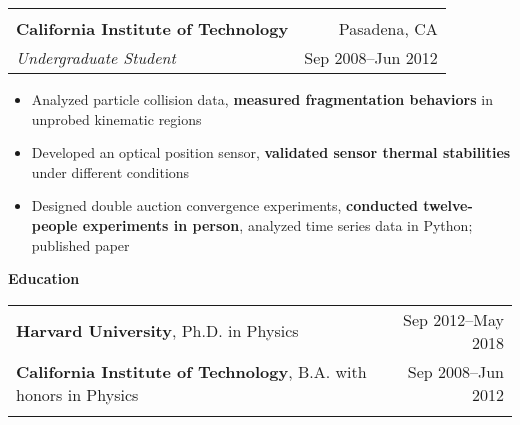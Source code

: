 \documentclass[letterpaper,11pt,oneside]{article}
\begin{document}
 \begin{flushleft}
 \vspace{-0.45cm}
 \begin{tabular}{@{} l r@{} }
    \hspace{0.78\linewidth} & \hspace{0.1\linewidth} \\
    \textbf{California Institute of Technology} & Pasadena, CA \\ 
    \textit{Undergraduate Student} & Sep 2008--Jun 2012 \\ 
 \end{tabular}
 \end{flushleft}
 \begin{flushleft}
  \begin{small}
 \begin{itemize}[leftmargin=*]
 \item Analyzed particle collision data, \textbf{measured fragmentation behaviors} in unprobed kinematic regions
 \item Developed an optical position sensor, \textbf{validated sensor thermal stabilities} under different conditions
 \item Designed double auction convergence experiments, \textbf{conducted twelve-people experiments in person}, analyzed time series data in Python; published paper
 \end{itemize}
  \end{small}
 \end{flushleft}

 \vspace{0.1cm}
\raggedright
\normalsize
\begin{flushleft}
 \textbf{\Large{Education}} \sout{\hfill} \\
\vspace{0.5cm}
\begin{tabular}{@{} l r@{}}
     \textbf{Harvard University}, Ph.D. in Physics & Sep 2012--May 2018 \\
     \textbf{California Institute of Technology}, B.A. with honors in  Physics & Sep 2008--Jun 2012\\
     \hspace{0.78\linewidth} & \hspace{0.1\linewidth} \\
\end{tabular}
\end{flushleft}




\clearpage
\end{document}
